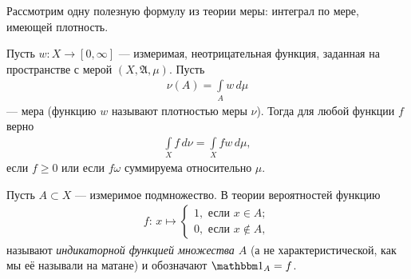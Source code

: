 \documentclass[../main.tex]{subfiles}
\begin{document}
Рассмотрим одну полезную формулу из теории меры: интеграл по мере, имеющей плотность.

\begin{thm}
\label{theorem:integral_on_measure_with_density}
Пусть $ w \colon X \to [0,\infty] $ --- измеримая, неотрицательная функция, заданная на пространстве с мерой $ (X,\mathfrak A,\mu) $. Пусть
 \begin{align*}
  \nu(A) = \int\limits_{A} w\,d\mu 
 \end{align*} --- мера (функцию $ w $ называют плотностью меры $ \nu $). Тогда для любой функции $ f $ верно
 \begin{align}
  \label{equation:integral_on_measure_with_density}
  \int\limits_{X} f\,d\nu = \int\limits_{X} f w \, d\mu,
 \end{align} если $ f \geqslant 0 $ или если $ f\omega $ суммируема относительно $ \mu $.
\end{thm}
\begin{conventn*}
 Пусть $ A \subset X $ --- измеримое подмножество. В теории вероятностей функцию
 \begin{align*}
  f \colon\, x \mapsto \begin{cases}
   1, \text{ если } x \in A; \\
   0, \text{ если } x \notin A,
  \end{cases} 
 \end{align*} называют \textit{индикаторной функцией множества $ A $} (а не характеристической, как мы её называли на матане) и обозначают $ \Ind_A = f $.
\end{conventn*}
\end{document}
